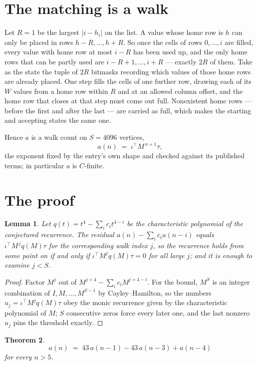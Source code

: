 \documentclass[11pt,a4paper]{article}
\theoremstyle{plain}
\newtheorem{theorem}{Theorem}
\newtheorem{lemma}[theorem]{Lemma}
\theoremstyle{definition}
\begin{document}
\section{The matching is a walk}

Let $R=1$ be the largest $|i-h_i|$ on the list. A value whose home row is $h$ can only be
placed in rows $h-R,\dots,h+R$. So once the cells of rows $0,\dots,i$ are filled, every
value with home row at most $i-R$ has been used up, and the only home rows that can be
partly used are $i-R+1,\dots,i+R$ --- exactly $2R$ of them. Take as the state the tuple of
$2R$ bitmasks recording which values of those home rows are already placed. One step fills
the cells of one further row, drawing each of its $W$ values from a home row within $R$
and at an allowed column offset, and the home row that closes at that step must come out
full. Nonexistent home rows --- before the first and after the last --- are carried as
full, which makes the starting and accepting states the same one.

Hence $a$ is a walk count on $S=4096$ vertices,
\[
a(n)\;=\;\iota^{\!\top}M^{\,n+1}\tau ,
\]
the exponent fixed by the entry's own shape and checked against its published terms; in
particular $a$ is $C$-finite.

\section{The proof}

\begin{lemma}\label{lem:crit}
Let $q(t)=t^{4}-\sum_i c_it^{4-i}$ be the characteristic polynomial of the
conjectured recurrence. The residual $a(n)-\sum_ic_ia(n-i)$ equals
$\iota^{\!\top}M^{\,j}q(M)\tau$ for the corresponding walk index $j$, so the recurrence
holds from some point on if and only if $\iota^{\!\top}M^{j}q(M)\tau=0$ for all large $j$;
and it is enough to examine $j<S$.
\end{lemma}

\begin{proof}
Factor $M^{j}$ out of $M^{j+4}-\sum_ic_iM^{j+4-i}$. For the bound, $M^{S}$
is an integer combination of $I,M,\dots,M^{S-1}$ by Cayley--Hamilton, so the numbers
$u_j=\iota^{\!\top}M^{j}q(M)\tau$ obey the monic recurrence given by the characteristic
polynomial of $M$; $S$ consecutive zeros force every later one, and the last nonzero $u_j$
pins the threshold exactly.
\end{proof}

\begin{theorem}
\[
a(n)\;=\;43\,a(n-1) - 43\,a(n-3) + a(n-4)
\]
for every $n>5$.
\end{theorem}
\end{document}
